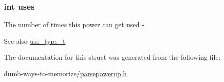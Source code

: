 \subsubsection[{\texorpdfstring{uses}{uses}}]{\setlength{\rightskip}{0pt plus 5cm}int uses}\hypertarget{structpower__s_ab8646ebc46bf478ca09510b7a01c7223}{}\label{structpower__s_ab8646ebc46bf478ca09510b7a01c7223}
The number of times this power can get used -\/ \begin{DoxySeeAlso}{See also}
\hyperlink{parsepowerup_8h_a2231c1a21540cc394825ca5e5df7cab4}{use\+\_\+type\+\_\+t} 
\end{DoxySeeAlso}


The documentation for this struct was generated from the following file\+:\begin{DoxyCompactItemize}
\item 
dumb-\/ways-\/to-\/memorize/\hyperlink{parsepowerup_8h}{parsepowerup.\+h}\end{DoxyCompactItemize}
